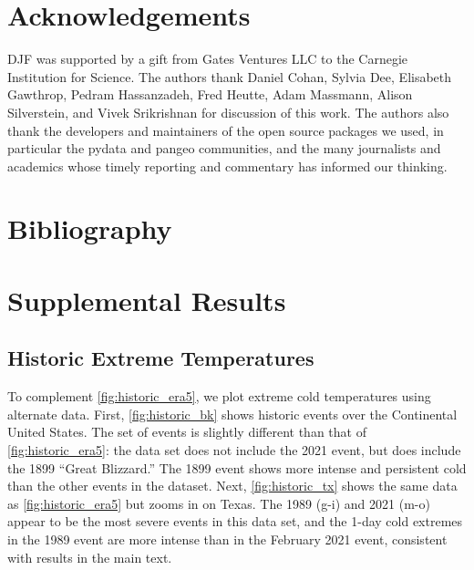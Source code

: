 \documentclass[12pt]{iopart}
\begin{document}
\section*{Acknowledgements}

DJF was supported by a gift from Gates Ventures LLC to the Carnegie Institution for Science.
The authors thank
Daniel Cohan,
Sylvia Dee,
Elisabeth Gawthrop,
Pedram Hassanzadeh,
Fred Heutte,
Adam Massmann,
Alison Silverstein,
and
Vivek Srikrishnan
for discussion of this work.
The authors also thank the developers and maintainers of the open source packages we used, in particular the pydata and pangeo communities, and the many journalists and academics whose timely reporting and commentary has informed our thinking.

\section*{Bibliography}



\clearpage
\appendix
\section{Supplemental Results}
\renewcommand{\thefigure}{S\arabic{figure}}
\setcounter{figure}{0}

\subsection{Historic Extreme Temperatures}

To complement \cref{fig:historic_era5}, we plot extreme cold temperatures using alternate data.
First, \cref{fig:historic_bk} shows historic events over the Continental United States.
The set of events is slightly different than that of \cref{fig:historic_era5}: the data set does not include the 2021 event, but does include the 1899 ``Great Blizzard.''
The 1899 event shows more intense and persistent cold than the other events in the dataset.
Next, \cref{fig:historic_tx} shows the same data as \cref{fig:historic_era5} but zooms in on Texas.
The 1989 (g-i) and 2021 (m-o) appear to be the most severe events in this data set, and the 1-day cold extremes in the 1989 event are more intense than in the February 2021 event, consistent with results in the main text.
\end{document}
